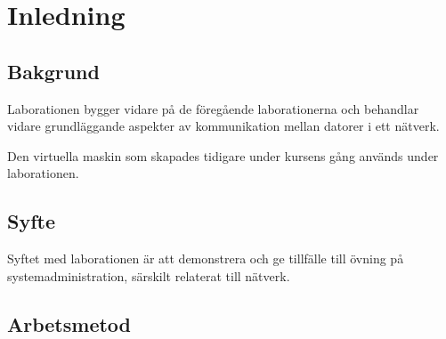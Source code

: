 %
%
%


\section{Inledning}


\subsection{Bakgrund}
Laborationen bygger vidare på de föregående laborationerna och behandlar vidare
grundläggande aspekter av kommunikation mellan datorer i ett nätverk.

Den virtuella maskin som skapades tidigare under kursens gång används under
laborationen.

\subsection{Syfte}
Syftet med laborationen är att demonstrera och ge tillfälle till övning på
systemadministration, särskilt relaterat till nätverk.

\subsection{Arbetsmetod}

